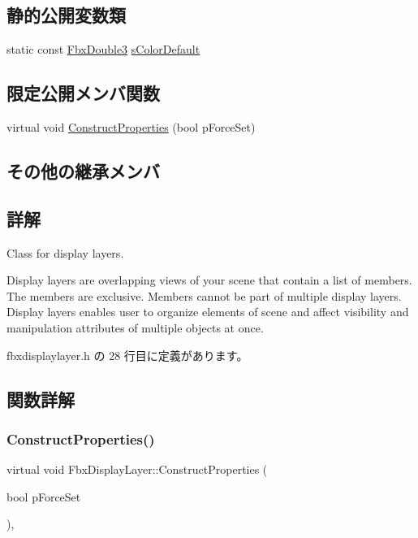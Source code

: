 \subsection*{静的公開変数類}
\begin{DoxyCompactItemize}
\item 
static const \hyperlink{fbxtypes_8h_ae0a96f14cde566774c7553aa7523b7a7}{Fbx\+Double3} \hyperlink{class_fbx_display_layer_a41bcfbb4b645d20daba8da41307fc1a5}{s\+Color\+Default}
\end{DoxyCompactItemize}
\subsection*{限定公開メンバ関数}
\begin{DoxyCompactItemize}
\item 
virtual void \hyperlink{class_fbx_display_layer_a5712965749ccf41c758913d2a0ebc0c9}{Construct\+Properties} (bool p\+Force\+Set)
\end{DoxyCompactItemize}
\subsection*{その他の継承メンバ}


\subsection{詳解}
Class for display layers.

Display layers are overlapping views of your scene that contain a list of members. The members are exclusive. Members cannot be part of multiple display layers. Display layers enables user to organize elements of scene and affect visibility and manipulation attributes of multiple objects at once. 

 fbxdisplaylayer.\+h の 28 行目に定義があります。



\subsection{関数詳解}
\mbox{\label{class_fbx_display_layer_a5712965749ccf41c758913d2a0ebc0c9}} 
\subsubsection{\texorpdfstring{Construct\+Properties()}{ConstructProperties()}}
{\footnotesize\ttfamily virtual void Fbx\+Display\+Layer\+::\+Construct\+Properties (\begin{DoxyParamCaption}\item[{bool}]{p\+Force\+Set }\end{DoxyParamCaption})\hspace{0.3cm}{\ttfamily [protected]}, {\ttfamily [virtual]}}

